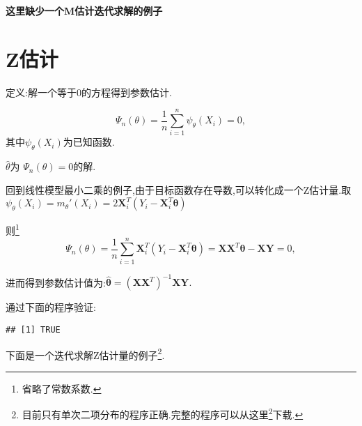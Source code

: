 \documentclass[]{ctexbook}
\newenvironment{Shaded}{\begin{snugshade}}{\end{snugshade}}
\newcommand{\DataTypeTok}[1]{\textcolor[rgb]{0.13,0.29,0.53}{#1}}
\newcommand{\DecValTok}[1]{\textcolor[rgb]{0.00,0.00,0.81}{#1}}
\newcommand{\KeywordTok}[1]{\textcolor[rgb]{0.13,0.29,0.53}{\textbf{#1}}}
\newcommand{\NormalTok}[1]{#1}
\newcommand{\OperatorTok}[1]{\textcolor[rgb]{0.81,0.36,0.00}{\textbf{#1}}}
\renewcommand{\href}[2]{#2\footnote{\url{#1}}}
\begin{document}
\textbf{这里缺少一个M估计迭代求解的例子}

\hypertarget{z}{%
\section{Z估计}\label{z}}

定义:解一个等于0的方程得到参数估计.

\[
\Psi_{n}(\theta)=\frac{1}{n} \sum_{i=1}^{n} \psi_{\theta}\left(X_{i}\right)=0,
\]
其中\(\psi_{\theta}\left(X_{i}\right)\)为已知函数.

\(\hat{\theta}\)为
\(\Psi_{n}(\theta)=0\)的解.

回到线性模型最小二乘的例子,由于目标函数存在导数,可以转化成一个Z估计量.取
\(\psi_{\theta}\left(X_{i}\right)=m_{\theta}'\left(X_{i}\right)=2\boldsymbol{X}_{i}^{T} \left(Y_{i}-\boldsymbol{X}_{i}^{T} \boldsymbol{\theta}\right)\)

则\footnote{省略了常数系数.}
\[
\Psi_{n}(\theta)=\frac{1}{n} \sum_{i=1}^{n}\boldsymbol{X}_{i}^{T}  \left(Y_{i}-\boldsymbol{X}_{i}^{T} \boldsymbol{\theta}\right) =\boldsymbol{X} \boldsymbol{X}^{T} \boldsymbol{\theta}-\boldsymbol{X} \boldsymbol{Y}=0,
\]

进而得到参数估计值为:\(\hat{\boldsymbol{\theta}}=\left(\boldsymbol{X} \boldsymbol{X}^{T}\right)^{-1} \boldsymbol{X} \boldsymbol{Y}.\)

通过下面的程序验证:

\begin{Shaded}
\end{Shaded}

\begin{verbatim}
## [1] TRUE
\end{verbatim}

下面是一个迭代求解Z估计量的例子\footnote{目前只有单次二项分布的程序正确.完整的程序可以从\href{code/glm.R}{这里}下载.}.
\end{document}
